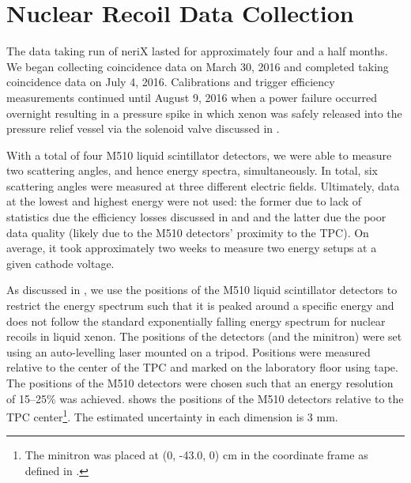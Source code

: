\section{Nuclear Recoil Data Collection}

The data taking run of neriX lasted for approximately four and a half months.  We began collecting coincidence data on March 30, 2016 and completed taking coincidence data on July 4, 2016.  Calibrations and trigger efficiency measurements continued until August 9, 2016 when a power failure occurred overnight resulting in a pressure spike in which xenon was safely released into the pressure relief vessel via the solenoid valve discussed in .

With a total of four M510 liquid scintillator detectors, we were able to measure two scattering angles, and hence energy spectra, simultaneously.  In total, six scattering angles were measured at three different electric fields.  Ultimately, data at the lowest and highest energy were not used: the former due to lack of statistics due the efficiency losses discussed in  and  and the latter due the poor data quality (likely due to the M510 detectors' proximity to the TPC).  On average, it took approximately two weeks to measure two energy setups at a given cathode voltage.

As discussed in , we use the positions of the M510 liquid scintillator detectors to restrict the energy spectrum such that it is peaked around a specific energy and does not follow the standard exponentially falling energy spectrum for nuclear recoils in liquid xenon.  The positions of the detectors (and the minitron) were set using an auto-levelling laser mounted on a tripod.  Positions were measured relative to the center of the TPC and marked on the laboratory floor using tape.  The positions of the M510 detectors were chosen such that an energy resolution of 15--25\% was achieved.   shows the positions of the M510 detectors relative to the TPC center\footnote{The minitron was placed at (0, -43.0, 0) cm in the coordinate frame as defined in .}.  The estimated uncertainty in each dimension is 3 mm.


